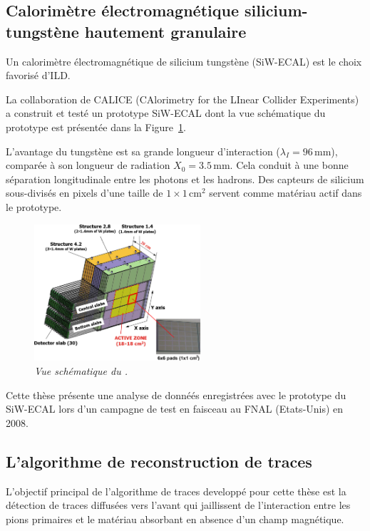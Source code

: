 \subsection*{Calorim\`etre \'electromagn\'etique silicium-tungst\`ene hautement granulaire}

Un calorim\`etre \'electromagn\'etique de silicium tungst\`ene (SiW-ECAL) est le
choix favorisé d'ILD.

La collaboration de CALICE (CAlorimetry for the LInear Collider Experiments) a construit et testé un prototype SiW-ECAL dont la vue schématique du prototype est présentée dans la Figure~\ref {fig:ECAL-schemeF}.

L'avantage du tungstène est sa grande longueur d'interaction ($\lambda_I = 96$\,mm), compar\'ee \`a son longueur de radiation  $X_0 = 3.5$\,mm. Cela conduit \`a une bonne s\'eparation longitudinale entre les photons et les hadrons. 
Des capteurs de silicium sous-divisés en pixels d'une taille de $1\times1$\,cm$^2$ servent comme mat\'eriau actif dans le prototype. 
\begin{figure}
	\centering
	\includegraphics[width=0.55\textwidth]{ECAL/graphics/ecal-new.png}
	\caption{\label{fig:ECAL-schemeF} \sl  Vue sch\'ematique du \ecal.}
\end{figure}

Cette thèse présente une analyse de donnéés enregistrées avec le prototype du SiW-ECAL lors d'un campagne de test en faisceau au FNAL (Etats-Unis) en 2008.  
\newpage
\subsection*{L'algorithme de reconstruction de traces}
L'objectif principal de l'algorithme de traces developpé pour cette thèse est la détection de traces diffusées vers l'avant qui jaillissent de l'interaction entre les pions primaires et le matériau absorbant en absence d'un champ magnétique.

